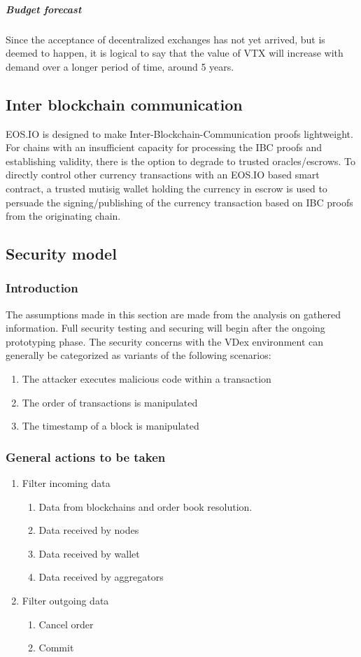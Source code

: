\documentclass[]{article}
\begin{document}
\subparagraph{Budget forecast}
Since the acceptance of decentralized exchanges has not yet arrived, but is deemed to happen, 
it is logical to say that the value of VTX will increase with demand over a longer period of time, around 5 years.

\subsection{Inter blockchain communication}
EOS.IO is designed to make Inter-Blockchain-Communication proofs lightweight. 
For chains with an insufficient capacity for processing the  IBC proofs and establishing validity, 
there is the option to degrade to trusted oracles/escrows.
To directly control other currency transactions with an
EOS.IO based smart contract, a trusted mutisig wallet holding the currency 
in escrow is used to persuade the signing/publishing of the currency 
transaction based on IBC proofs from the originating chain.	
\subsection{Security model}
\subsubsection{Introduction}
The assumptions made in this section are made from the analysis on gathered information. 
Full security testing and securing will begin after the ongoing prototyping phase. 
The security concerns with the VDex environment can generally be categorized as variants of the following scenarios:
	\begin{enumerate}
		\item The attacker executes malicious code within a transaction
		\item The order of transactions is manipulated
		\item The timestamp of a block is manipulated
	\end{enumerate}
	\subsubsection{General actions to be taken}
		\begin{enumerate}	
		\item{Filter incoming data} 
		\begin{enumerate}
			\item Data from blockchains and order book resolution.
			\item Data received by nodes
			\item Data received by wallet
			\item Data received by aggregators
		\end{enumerate}
		\item {Filter outgoing data}
		\begin{enumerate}
			\item Cancel order
			\item Commit
		\end{enumerate}
	\end{enumerate}
\end{document}
